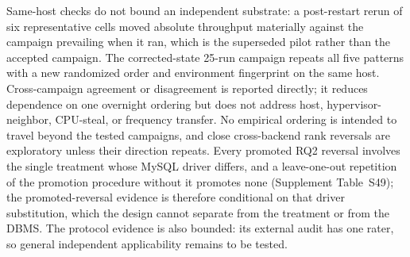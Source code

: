Same-host checks do not bound an independent substrate: a post-restart rerun of six representative
cells moved absolute throughput materially against the campaign prevailing when it ran, which is the
superseded pilot rather than the accepted campaign.
The corrected-state 25-run campaign repeats all five patterns with a new randomized order and
environment fingerprint on the same host.
Cross-campaign agreement or disagreement is reported directly; it reduces dependence on one overnight
ordering but does not address host, hypervisor-neighbor, CPU-steal, or frequency transfer.
No empirical ordering is intended to travel beyond the tested campaigns, and close cross-backend rank
reversals are exploratory unless their direction repeats.
Every promoted RQ2 reversal involves the single treatment whose MySQL driver differs, and a
leave-one-out repetition of the promotion procedure without it promotes none (Supplement Table~S49);
the promoted-reversal evidence is therefore conditional on that driver substitution, which the design
cannot separate from the treatment or from the DBMS.
The protocol evidence is also bounded: its external audit has one rater, so general independent
applicability remains to be tested.

